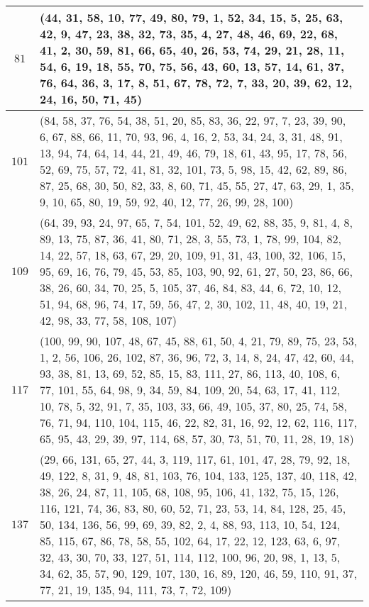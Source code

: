 \documentclass{article}
\theoremstyle{remark}
\theoremstyle{plain}
\begin{document}
\begin{appendices}
\begin{table}[H]
\begin{tabular}{ ||c p{14.3cm}|| }
    \hline
    
    $81$ & (44, 31, 58, 10, 77, 49, 80, 79, 1, 52, 34, 15, 5, 25, 63, 42, 9, 47, 23, 38, 32, 73, 35, 4, 27, 48, 46, 69, 22, 68, 41, 2, 30, 59, 81, 66, 65, 40, 26, 53, 74, 29, 21, 28, 11, 54, 6, 19, 18, 55, 70, 75, 56, 43, 60, 13, 57, 14, 61, 37, 76, 64, 36, 3, 17, 8, 51, 67, 78, 72, 7, 33, 20, 39, 62, 12, 24, 16, 50, 71, 45) \\
    
    \hline

    $101$ & (84, 58, 37, 76, 54, 38, 51, 20, 85, 83, 36, 22, 97, 7, 23, 39, 90, 6, 67, 88, 66, 11, 70, 93, 96, 4, 16, 2, 53, 34, 24, 3, 31, 48, 91, 13, 94, 74, 64, 14, 44, 21, 49, 46, 79, 18, 61, 43, 95, 17, 78, 56, 52, 69, 75, 57, 72, 41, 81, 32, 101, 73, 5, 98, 15, 42, 62, 89, 86, 87, 25, 68, 30, 50, 82, 33, 8, 60, 71, 45, 55, 27, 47, 63, 29, 1, 35, 9, 10, 65, 80, 19, 59, 92, 40, 12, 77, 26, 99, 28, 100) \\
    
    \hline

    $109$ & (64, 39, 93, 24, 97, 65, 7, 54, 101, 52, 49, 62, 88, 35, 9, 81, 4, 8, 89, 13, 75, 87, 36, 41, 80, 71, 28, 3, 55, 73, 1, 78, 99, 104, 82, 14, 22, 57, 18, 63, 67, 29, 20, 109, 91, 31, 43, 100, 32, 106, 15, 95, 69, 16, 76, 79, 45, 53, 85, 103, 90, 92, 61, 27, 50, 23, 86, 66, 38, 26, 60, 34, 70, 25, 5, 105, 37, 46, 84, 83, 44, 6, 72, 10, 12, 51, 94, 68, 96, 74, 17, 59, 56, 47, 2, 30, 102, 11, 48, 40, 19, 21, 42, 98, 33, 77, 58, 108, 107) \\
    
    \hline

    $117$ & (100, 99, 90, 107, 48, 67, 45, 88, 61, 50, 4, 21, 79, 89, 75, 23, 53, 1, 2, 56, 106, 26, 102, 87, 36, 96, 72, 3, 14, 8, 24, 47, 42, 60, 44, 93, 38, 81, 13, 69, 52, 85, 15, 83, 111, 27, 86, 113, 40, 108, 6, 77, 101, 55, 64, 98, 9, 34, 59, 84, 109, 20, 54, 63, 17, 41, 112, 10, 78, 5, 32, 91, 7, 35, 103, 33, 66, 49, 105, 37, 80, 25, 74, 58, 76, 71, 94, 110, 104, 115, 46, 22, 82, 31, 16, 92, 12, 62, 116, 117, 65, 95, 43, 29, 39, 97, 114, 68, 57, 30, 73, 51, 70, 11, 28, 19, 18) \\
    
    \hline

    $137$ & (29, 66, 131, 65, 27, 44, 3, 119, 117, 61, 101, 47, 28, 79, 92, 18, 49, 122, 8, 31, 9, 48, 81, 103, 76, 104, 133, 125, 137, 40, 118, 42, 38, 26, 24, 87, 11, 105, 68, 108, 95, 106, 41, 132, 75, 15, 126, 116, 121, 74, 36, 83, 80, 60, 52, 71, 23, 53, 14, 84, 128, 25, 45, 50, 134, 136, 56, 99, 69, 39, 82, 2, 4, 88, 93, 113, 10, 54, 124, 85, 115, 67, 86, 78, 58, 55, 102, 64, 17, 22, 12, 123, 63, 6, 97, 32, 43, 30, 70, 33, 127, 51, 114, 112, 100, 96, 20, 98, 1, 13, 5, 34, 62, 35, 57, 90, 129, 107, 130, 16, 89, 120, 46, 59, 110, 91, 37, 77, 21, 19, 135, 94, 111, 73, 7, 72, 109) \\
    

\end{tabular}
\end{table}
\end{appendices}
\end{document}
